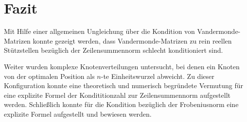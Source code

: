 \chapter{Fazit}

Mit Hilfe einer allgemeinen Ungleichung über die Kondition von
Vandermonde-Matrizen konnte gezeigt werden, dass Vandermonde-Matrizen zu rein
reellen Stützstellen bezüglich der Zeilensummennorm schlecht konditioniert
sind.

Weiter wurden komplexe Knotenverteilungen untersucht, bei denen ein Knoten von
der optimalen Position als $n$-te Einheitswurzel abweicht.
Zu dieser Konfiguration konnte eine theoretisch und numerisch begründete
Vermutung für eine explizite Formel der Kondititionzahl zur Zeilensummennorm
aufgestellt werden.
Schließlich konnte für die Kondition bezüglich der Frobeniusnorm eine explizite
Formel aufgestellt und bewiesen werden.
